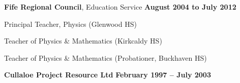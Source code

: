 \documentclass[10pt]{article}
\newenvironment{outerlist}[1][\enskip\textbullet]%
        {\begin{itemize}[#1]}{\end{itemize}%
         \vspace{-.6\baselineskip}}
\newenvironment{innerlist}[1][\enskip\textbullet]%
        {\begin{compactitem}[#1]}{\end{compactitem}}
\newcommand{\blankline}{\quad\pagebreak[2]}
\begin{document}
\blankline

\textbf{Fife Regional Council}, Education Service
     \hfill \textbf{August 2004 to July 2012}

\begin{outerlist}
\item[]
\begin{innerlist}
	\item Principal Teacher, Physics (Glenwood HS)
	\item Teacher of Physics \& Mathematics (Kirkcaldy HS)
	\item Teacher of Physics \& Mathematics (Probationer, Buckhaven HS)
\end{innerlist}
\end{outerlist}

\blankline

\textbf{Cullaloe Project Resource Ltd}        \hfill \textbf{February 1997 -- July 2003}
\end{document}
